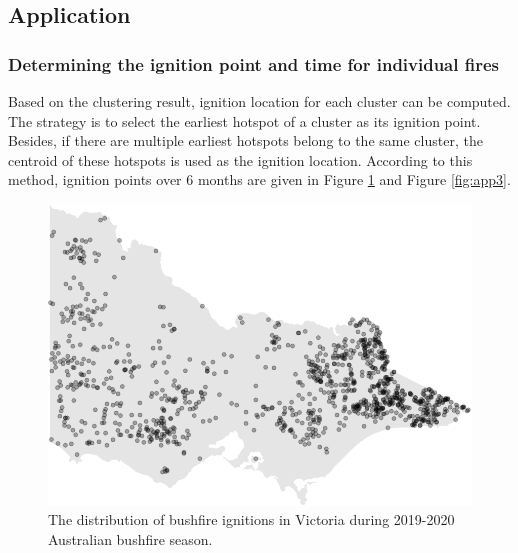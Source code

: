 \hypertarget{application}{%
\subsection{Application}\label{application}}

\hypertarget{determining-the-ignition-point-and-time-for-individual-fires}{%
\subsubsection{Determining the ignition point and time for individual
fires}\label{determining-the-ignition-point-and-time-for-individual-fires}}

Based on the clustering result, ignition location for each cluster can
be computed. The strategy is to select the earliest hotspot of a cluster
as its ignition point. Besides, if there are multiple earliest hotspots
belong to the same cluster, the centroid of these hotspots is used as
the ignition location. According to this method, ignition points over 6
months are given in Figure \ref{fig:clusteringfinalresults} and Figure
\ref{fig:app3}.

\begin{Schunk}
\begin{figure}

{\centering \includegraphics[width=0.8\linewidth]{clustering_paper_files/figure-latex/clusteringfinalresults-1} 

}

\caption[ The distribution of bushfire ignitions in Victoria during 2019-2020 Australian bushfire season]{ The distribution of bushfire ignitions in Victoria during 2019-2020 Australian bushfire season.}\label{fig:clusteringfinalresults}
\end{figure}
\end{Schunk}

